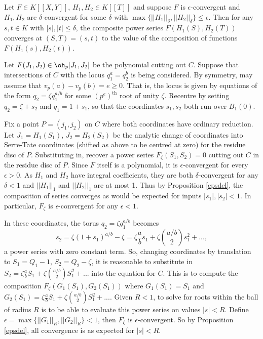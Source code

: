 \documentclass[12pt,letterpaper]{article}
\begin{document}
	
	\begin{prop} \label{epsdel}
		Let $F \in K[[X,Y]]$, $H_1, H_2\in K[[T]]$ and suppose $F$ is $\epsilon$-convergent and $H_1,H_2$ are $\delta$-convergent for some $\delta$ with $\max\{||H_1||_\delta,||H_2||_\delta\}\leq\epsilon$. Then for any $s,t\in K$ with $|s|,|t|\leq \delta$, the composite power series $F(H_1(S),H_2(T))$ converges at $(S,T)=(s,t)$ to the value of the composition of functions $F(H_1(s),H_2(t))$.
	\end{prop}
	
	
	
	Let $F(J_1,J_2)\in \oh_p[J_1,J_2]$ be the polynomial cutting out $C$. Suppose that intersections of $C$ with the locus $q_1^a = q_2^b$ is being considered. By symmetry, may assume that $v_p(a)-v_p(b)=e\geq 0$. That is, the locus is given by equations of the form $q_2 = \zeta q_1^{a/b}$ for some $(p^e)^\text{th}$ root of unity $\zeta$. Recentre by setting $q_2=\zeta+s_2$ and $q_1 = 1+s_1$, so that the coordinates $s_1,s_2$ both run over $B_1(0)$. 
	
	Fix a point $P=(j_1,j_2)$ on $C$ where both coordinates have ordinary reduction. Let $J_1 = H_1(S_1)$, $J_2 = H_2(S_2)$ be the analytic change of coordinates into Serre-Tate coordinates (shifted as above to be centred at zero) for the residue disc of $P$. Substituting in, recover a power series $F_\zeta(S_1,S_2)=0$ cutting out $C$ in the residue disc of $P$. Since $F$ itself is a polynomial, it is $\epsilon$-convergent for every $\epsilon>0$. As $H_1$ and $H_2$ have integral coefficients, they are both $\delta$-convergent for any $\delta<1$ and $||H_1||_1$ and $||H_2||_1$ are at most 1. Thus by Proposition \ref{epsdel}, the composition of series converges as would be expected for inputs $|s_1|,|s_2|< 1$. In particular, $F_\zeta$ is $\epsilon$-convergent for any $\epsilon<1$.
	
	In these coordinates, the torus $q_2 = \zeta q_1^{a/b}$ becomes
	\[s_2 = \zeta(1+s_1)^{a/b} -\zeta = \zeta \frac{a}{b} s_1 + \zeta \binom{a/b}{2}s_1^2 + ...,\]
	a power series with zero constant term. So, changing coordinates by translation to $S_1= Q_1-1$, $S_2 = Q_2-\zeta$, it is reasonable to substitute in $S_2 =  \zeta \frac{a}{b} S_1 + \zeta \binom{a/b}{2}S_1^2 + ... $ into the equation for $C$. This is to compute the composition $F_\zeta(G_1(S_1),G_2(S_1))$ where $G_1(S_1) = S_1$ and $G_2(S_1)=\zeta \frac{a}{b} S_1 + \zeta \binom{a/b}{2}S_1^2 + ...$. Given $R<1$, to solve for roots within the ball of radius $R$ is to be able to evaluate this power series on values $|s|<R$. Define $\epsilon=\max\{||G_1||_R,||G_2||_R\}<1$, then $F_\zeta$ is $\epsilon$-convergent. So by Proposition \ref{epsdel}, all convergence is as expected for $|s|<R$. 
	
\end{document}
